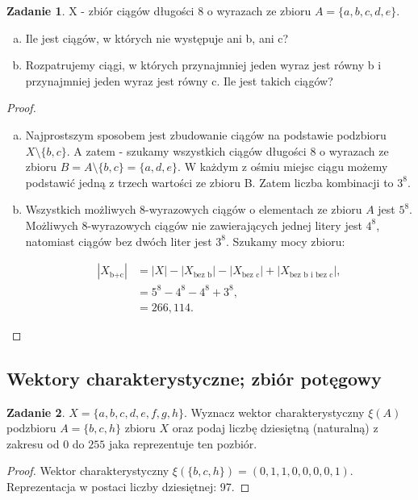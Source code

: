 \documentclass[11pt]{article}
\theoremstyle{definition}
\newtheorem{zadanie}{Zadanie}
\numberwithin{zadanie}{subsection}
\begin{document}
\begin{zadanie}
    X - zbiór ciągów długości 8 o wyrazach ze zbioru $A = \{ a, b, c, d, e \}$.

    \begin{enumerate}[a)]
        \item Ile jest ciągów, w których nie występuje ani b, ani c?

        \item Rozpatrujemy ciągi, w których przynajmniej jeden wyraz jest równy b i przynajmniej jeden wyraz jest równy c. Ile jest takich ciągów?
    \end{enumerate}
\end{zadanie}
\begin{proof}
    \begin{enumerate}[a)]
        \item Najprostszym sposobem jest zbudowanie ciągów na podstawie podzbioru $X\setminus\{b,c\}$. A zatem - szukamy wszystkich ciągów długości $8$ o wyrazach ze zbioru $B = A\setminus\{b,c\} = \{a,d,e\}$. W każdym z ośmiu miejsc ciągu możemy podstawić jedną z trzech wartości ze zbioru B. Zatem liczba kombinacji to $3^8$.
        \item Wszystkich możliwych 8-wyrazowych ciągów o elementach ze zbioru $A$ jest $5^8$.  Możliwych 8-wyrazowych ciągów nie zawierających jednej litery jest $4^8$, natomiast ciągów bez dwóch liter jest $3^8$. Szukamy mocy zbioru:

              \begin{align*}
                  |X_{\text{b+c}}| & = |X| - |X_{\text{bez b}}| - |X_{\text{bez c}}| + |X_{\text{bez b i bez c}}|, \\
                                   & = 5^8 - 4^8-4^8+3^8,                                                          \\
                                   & = 266,114.
              \end{align*}

    \end{enumerate}
\end{proof}


\subsection{Wektory charakterystyczne; zbiór potęgowy}

\begin{zadanie}
    $X=\{a,b,c,d,e,f,g,h\}.$ Wyznacz wektor charakterystyczny $\xi(A)$ podzbioru $A=\{b,c,h\}$ zbioru $X$ oraz podaj liczbę dziesiętną (naturalną) z zakresu od $0$ do $255$ jaka reprezentuje ten pozbiór.
\end{zadanie}
\begin{proof}
    Wektor charakterystyczny $\xi(\{b,c,h\}) = (0,1,1,0,0,0,0,1)$. Reprezentacja w postaci liczby dziesiętnej: 97.
\end{proof}
\end{document}
